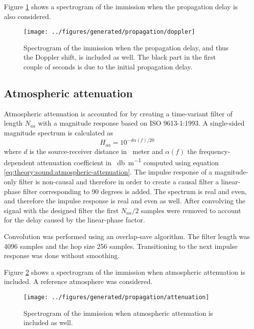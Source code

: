 Figure \ref{fig:implementation:propagation:doppler} shows a spectrogram of the
immission when the propagation delay is also considered.

\begin{figure}[H]
  \centering
  \texttt{[image: ../figures/generated/propagation/doppler]}
  \caption{Spectrogram of the immission when the propagation delay, and thus the Doppler shift, is included as well. The black part in the first couple of seconds is due to the initial propagation delay.}
  \label{fig:implementation:propagation:doppler}
\end{figure}


\subsection{Atmospheric attenuation}
Atmospheric attenuation is accounted for by creating a time-variant filter of length $N_{aa}$
with a magnitude response based on ISO 9613-1:1993\cite{ISO9613-1}. A single-sided magnitude spectrum is calculated as
\begin{equation}
 H_{aa} = 10^{- d \alpha(f) / 20}
\end{equation}
where $d$ is the source-receiver distance in \SI{}{meter} and $\alpha(f)$ the
frequency-dependent attenuation coefficient in \SI{}{\decibel\per\meter} computed using
equation \ref{eq:theory:sound:atmospheric-attenuation}.
The impulse response of a magnitude-only filter is non-causal and therefore in
order to create a causal filter a linear-phase filter corresponding to 90
degrees is added. The spectrum is real and even, and therefore the impulse
response is real and even as well. After convolving the signal with the designed
filter the first $N_{aa}/2$ samples were removed to account for the delay caused
by the linear-phase factor.

Convolution was performed using an overlap-save algorithm. The filter length was
4096 samples and the hop size 256 samples. Transitioning to the next impulse
response was done without smoothing.

Figure \ref{fig:implementation:propagation:attenuation} shows a spectrogram of
the immission when atmospheric attenuation is included. A reference atmosphere
was considered.

\begin{figure}[H]
  \centering
  \texttt{[image: ../figures/generated/propagation/attenuation]}
  \caption{Spectrogram of the immission when atmospheric attenuation is included as well.}
  \label{fig:implementation:propagation:attenuation}
\end{figure}

